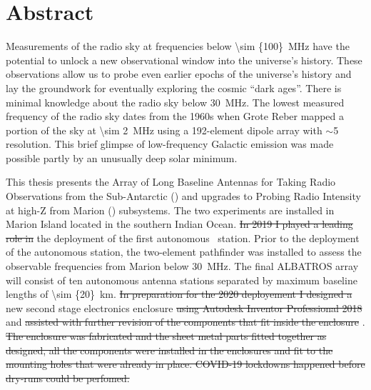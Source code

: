 \section*{Abstract}
	
Measurements of the radio sky at frequencies below \SI{\sim {100}}{\mega \hertz} have the potential to unlock a new observational window into the universe’s history. These observations allow us to probe even earlier epochs of the universe’s history and lay the groundwork for eventually exploring the cosmic “dark ages”.  There is minimal knowledge about the radio sky below \SI{30}{\mega \hertz}. The lowest measured frequency of the radio sky dates from the 1960s when Grote Reber mapped a portion of the sky at \SI{\sim 2}{\mega \hertz} using a 192-element dipole array with $\sim$5 \degree resolution. This brief glimpse of low-frequency Galactic emission was made possible partly by an unusually deep solar minimum.

This thesis presents the Array of Long Baseline Antennas for Taking Radio Observations from the Sub-Antarctic (\albatros) and upgrades to Probing Radio Intensity at high-Z from Marion (\prizm) subsystems. The two experiments are installed in Marion Island located in the southern Indian Ocean. \st{In 2019 I played a leading role in}  the deployment of the first autonomous \albatros\ station. Prior to the deployment of the autonomous station, the two-element pathfinder was installed to assess the observable frequencies from Marion below \SI{30}{\mega \hertz}. The final ALBATROS array will consist of ten autonomous antenna stations separated by maximum baseline lengths of \SI{\sim {20}}{km}. \st{In preparation for the 2020 deployement I designed a}  new second stage electronics enclosure \st{using Autodesk Inventor Professional 2018}  and \st{assisted with further revision of the components that fit inside the enclosure} . \st{The enclosure was fabricated and the sheet metal parts fitted together as designed, all the components were installed in the enclosures and fit to the mounting holes that were already in place. COVID-19 lockdowns happened before dry-runs could be perfomed.} 

